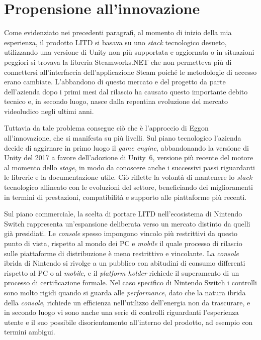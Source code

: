 \section{Propensione all'innovazione}
\label{sec:propensione-innovazione}


Come evidenziato nei precedenti paragrafi, al momento di inizio della mia esperienza, il prodotto LITD si basava su uno \textit{stack} tecnologico desueto, utilizzando una versione di Unity non più supportata e aggiornata o in situazioni peggiori si trovava la libreria Steamworks.NET che non permetteva più di connettersi all'interfaccia dell'applicazione Steam poiché le metodologie di accesso erano cambiate. L'abbandono di questo mercato e del progetto da parte dell'azienda dopo i primi mesi dal rilascio ha causato questo importante debito tecnico e, in secondo luogo, nasce dalla repentina evoluzione del mercato videoludico negli ultimi anni.

Tuttavia da tale problema consegue ciò che è l'approccio di Eggon all'innovazione, che si manifesta su più livelli. Sul piano tecnologico l'azienda decide di aggirnare in primo luogo il \textit{game engine}, abbandonando la versione di Unity del 2017 a favore dell'adozione di Unity~6, versione più recente del motore al momento dello \textit{stage}, in modo da conoscere anche i successivi passi riguardanti le librerie e la documentazione utile. Ciò riflette la volontà di mantenere lo \textit{stack} tecnologico allineato con le evoluzioni del settore, beneficiando dei miglioramenti in termini di prestazioni, compatibilità e supporto alle piattaforme più recenti.

Sul piano commerciale, la scelta di portare LITD nell'ecosistema di Nintendo Switch rappresenta un'espansione deliberata verso un mercato distinto da quelli già presidiati.
Le \textit{console} spesso impongono vincolo più restrittivi da questo punto di vista, rispetto al mondo dei PC e \textit{mobile} il quale processo di rilascio sulle piattaforme di distribuzione è meno restrittivo e vincolante.
La \textit{console} ibrida di Nintendo si rivolge a un pubblico con abitudini di consumo differenti rispetto al PC o al \textit{mobile}, e il \textit{platform holder} richiede il superamento di un processo di certificazione formale.
Nel caso specifico di Nintendo Switch i controlli sono molto rigidi quando si guarda alle \textit{performance}, dato che la natura ibrida della \textit{console}, richiede un efficienza nell'utilizzo dell'energia non da trascurare, e in secondo luogo vi sono anche una serie di controlli riguardanti l'esperienza utente e il suo possibile disorientamento all'interno del prodotto, ad esempio con termini ambigui.

